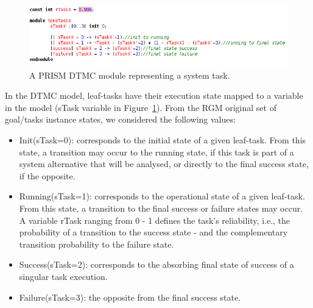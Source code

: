 \begin{figure}[ht]
\centering
\includegraphics[width=1\textwidth]{imgs/PRISM_TASK_MODULE.png}
\caption{A PRISM DTMC module representing a system task.}
\label{fig:PRISM_TASK_MODULE}
\end{figure}

In the DTMC model, leaf-tasks have their execution state mapped to a variable in the model (sTask variable in Figure~\ref{fig:PRISM_TASK_MODULE}). From the RGM original set of goal/tasks instance states, we considered the following values:

\begin{itemize}

\item Init(sTask=0): corresponds to the initial state of a given leaf-task. From this state, a transition may occur to the running state, if this task is part of a system alternative that will be analysed, or directly to the final success state, if the opposite.
\medskip

\item Running(sTask=1): corresponds to the operational state of a given leaf-task. From this state, a transition to the final success or failure states may occur. A variable rTask ranging from 0 - 1 defines the task's reliability, i.e., the probability of a transition to the success state - and the complementary transition probability to the failure state.
\medskip

\item Success(sTask=2): corresponds to the absorbing final state of success of a singular task execution.
\medskip

\item Failure(sTask=3): the opposite from the final success state.

\end{itemize}



